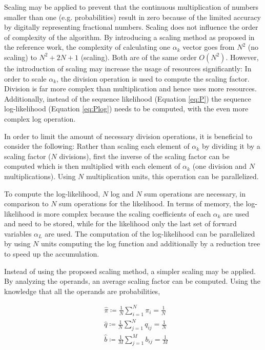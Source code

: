 \documentclass[mscthesis]{usiinfthesis}
\begin{document}
Scaling may be applied to prevent that the continuous multiplication of numbers
smaller than one (e.g. probabilities) result in zero because of the limited
accuracy by digitally representing fractional numbers. Scaling does not
influence the order of complexity of the algorithm. By introducing a scaling
method as proposed in the reference work, the complexity of calculating one
$\alpha_k$ vector goes from $N^2$ (no scaling) to $N^2 + 2N + 1$ (scaling). Both
are of the same order $O(N^2)$. However, the introduction of scaling may
increase the usage of resources significantly: In order to scale $\alpha_k$,
the division operation is used to compute the scaling factor. Division is far
more complex than multiplication and hence uses more resources. Additionally,
instead of the sequence likelihood (Equation \ref{eq:P}) the sequence
log-likelihood (Equation \ref{eq:Plog}) needs to be computed, with the even
more complex log operation.

In order to limit the amount of necessary division operations, it is beneficial
to consider the following: Rather than scaling each element of $\alpha_k$ by
dividing it by a scaling factor ($N$ divisions), first the inverse of the
scaling factor can be computed which is then multiplied with each element of
$\alpha_k$ (one division and $N$ multiplications). Using $N$ multiplication
units, this operation can be parallelized.

To compute the log-likelihood, $N$ log and $N$ sum operations are necessary, in
comparison to $N$ sum operations for the likelihood. In terms of memory, the
log-likelihood is more complex because the scaling coefficients of each
$\alpha_k$ are used and need to be stored, while for the likelihood only the
last set of forward variables $\alpha_L$ are used. The computation of the
log-likelihood can be parallelized by using $N$ units computing the log
function and additionally by a reduction tree to speed up the accumulation.

Instead of using the proposed scaling method, a simpler scaling may be applied.
By analyzing the operands, an average scaling factor can be computed. Using the
knowledge that all the operands are probabilities,

\begin{equation}\begin{split}
    \label{eq:scaling_sum}
    &\hat{\pi} \coloneqq \frac{1}{N}\sum\limits_{i=1}^{N} \pi_i = \frac{1}{N} \\
    &\hat{q} \coloneqq \frac{1}{N}\sum\limits_{j=1}^{N} q_{ij} = \frac{1}{N} \\
    &\hat{b} \coloneqq \frac{1}{M}\sum\limits_{j=1}^{M} b_{ij} = \frac{1}{M}
\end{split}\end{equation}
\end{document}
